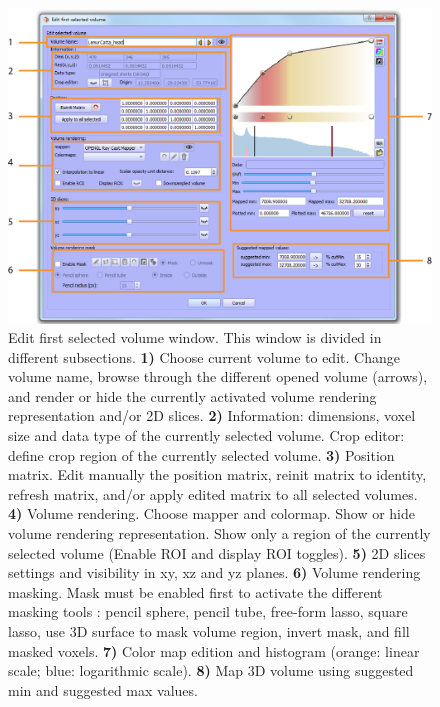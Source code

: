 \begin{figure}
  \centering
  \includegraphics[scale=1]{images/14/edit_volume_window.png}
\caption{Edit first selected volume window. This window is divided in different subsections. \textbf{1)} Choose current volume to edit. Change volume name, browse through the different opened volume (arrows), and render or hide the currently activated volume rendering representation and/or 2D slices.  \textbf{2)} Information: dimensions, voxel size and data type of the currently selected volume. Crop editor: define crop region of the currently selected volume. \textbf{3)} Position matrix. Edit manually the position matrix, reinit matrix to identity, refresh matrix, and/or apply edited matrix to all selected volumes. \textbf{4)} Volume rendering. Choose mapper and colormap. Show or hide volume rendering representation. Show only a region of the currently selected volume (Enable ROI and display ROI toggles). \textbf{5)} 2D slices settings and visibility in xy, xz and yz planes. \textbf{6)} Volume rendering masking. Mask must be enabled first to activate the different masking tools : pencil sphere, pencil tube, free-form lasso, square lasso, use 3D surface to mask volume region, invert mask, and fill masked voxels.  \textbf{7)} Color map edition and histogram (orange: linear scale; blue: logarithmic scale). \textbf{8)} Map 3D volume using suggested min and suggested max values.}	
\label{edit_volume_window}
 \end{figure}

